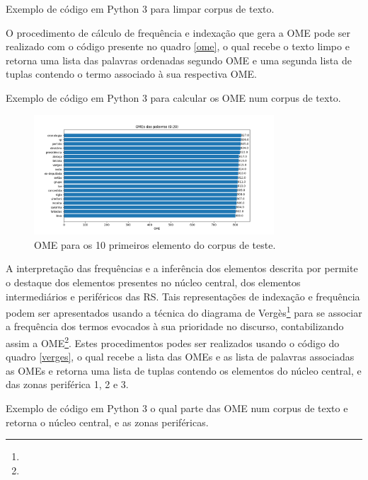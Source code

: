 \documentclass[
  12pt,       %
  openright,      %
  twoside,      %
  a4paper,      %
  english,      %
  french,       %
  spanish,      %
  brazil        %
  ]{abntex2}
\begin{document}
\begin{quadro}[htb]
\caption{Exemplo de código em Python 3 para limpar corpus de texto.}

\end{quadro}


O procedimento de cálculo de frequência e indexação que gera a OME pode ser realizado com o código presente no quadro \ref{ome}, o qual recebe o texto limpo e retorna uma lista das palavras ordenadas segundo OME e uma segunda lista de tuplas contendo o termo associado à sua respectiva OME.


\begin{quadro}[htb]
\caption{Exemplo de código em Python 3 para calcular os OME num corpus de texto.}

\end{quadro}


\begin{figure}[h]
  \centering
  \includegraphics[width=0.8\textwidth]{OME_1.png}
  \caption{OME para os 10 primeiros elemento do corpus de teste.}
  \label{ome_0-10}
\end{figure}

A interpretação das frequências e a inferência dos elementos descrita por permite o destaque dos elementos presentes no núcleo central, dos elementos intermediários e periféricos das RS. Tais representações de indexação e frequência podem ser apresentados usando a técnica do diagrama de Vergès\footnote{} para se associar a frequência dos termos evocados à sua prioridade no discurso, contabilizando assim a OME\footnote{}. Estes procedimentos podes ser realizados usando o código do quadro \ref{verges}, o qual recebe a lista das OMEs e as lista de palavras associadas as OMEs e retorna uma lista de tuplas contendo os elementos do núcleo central, e das zonas periférica 1, 2 e 3.


\begin{quadro}[htb]
\caption{Exemplo de código em Python 3 o qual parte das OME num corpus de texto e retorna o núcleo central, e as zonas periféricas.}

\end{quadro}
\end{document}
